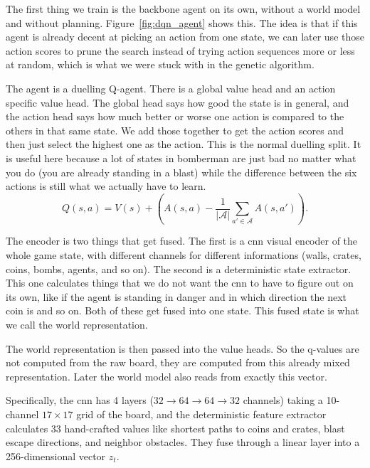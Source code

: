 The first thing we train is the backbone agent on its own, without a world model and without planning. Figure~\ref{fig:dqn_agent} shows this. The idea is that if this agent is already decent at picking an action from one state, we can later use those action scores to prune the search instead of trying action sequences more or less at random, which is what we were stuck with in the genetic algorithm.

The agent is a duelling Q-agent. There is a global value head and an action specific value head. The global head says how good the state is in general, and the action head says how much better or worse one action is compared to the others in that same state. We add those together to get the action scores and then just select the highest one as the action. This is the normal duelling split. It is useful here because a lot of states in bomberman are just bad no matter what you do (you are already standing in a blast) while the difference between the six actions is still what we actually have to learn.
\begin{equation}
Q(s, a) = V(s) + \left(A(s, a) - \frac{1}{|\mathcal{A}|} \sum_{a' \in \mathcal{A}} A(s, a')\right).
\end{equation}

The encoder is two things that get fused. The first is a cnn visual encoder of the whole game state, with different channels for different informations (walls, crates, coins, bombs, agents, and so on). The second is a deterministic state extractor. This one calculates things that we do not want the cnn to have to figure out on its own, like if the agent is standing in danger and in which direction the next coin is and so on. Both of these get fused into one state. This fused state is what we call the world representation.

The world representation is then passed into the value heads. So the q-values are not computed from the raw board, they are computed from this already mixed representation. Later the world model also reads from exactly this vector.

Specifically, the cnn has 4 layers ($32 \to 64 \to 64 \to 32$ channels) taking a 10-channel $17 \times 17$ grid of the board, and the deterministic feature extractor calculates 33 hand-crafted values like shortest paths to coins and crates, blast escape directions, and neighbor obstacles. They fuse through a linear layer into a 256-dimensional vector $z_t$.

